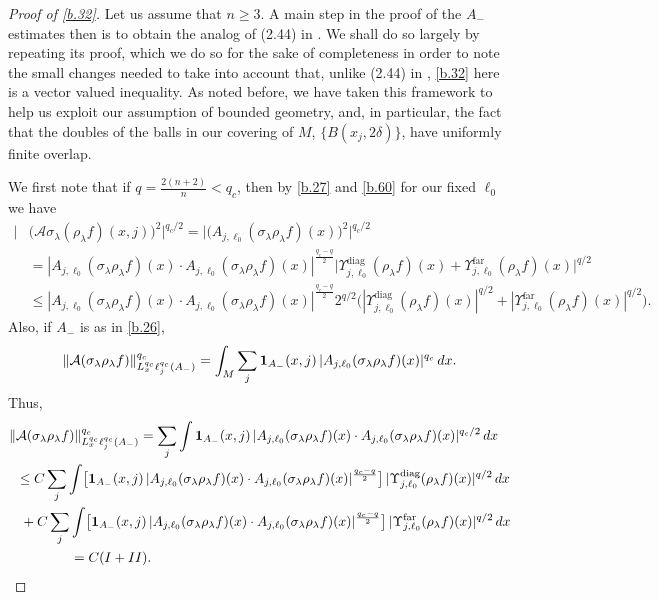 \documentclass[10pt]{amsart}
\newcommand{\la}{\lambda}
\newcommand{\1}{{\bf 1}}
\newcommand{\A}{{\mathcal A}}
\newcommand{\diag}{\Upsilon^{\text{diag}}}
\newcommand{\far}{\Upsilon^{\text{far}}}
\begin{document}
\begin{proof}[Proof of \eqref{b.32}]
Let us assume that $n\ge3$.  A main step in the proof of the $A_-$ estimates then is to obtain the analog of (2.44) in \cite{HSp}.
We shall do so largely by repeating its proof, which we do so for the sake of completeness in order to note the small changes needed
to take into account that, unlike (2.44) in \cite{HSp}, \eqref{b.32} here is a vector valued inequality.  As noted before, we have taken
this framework to help us exploit our assumption of bounded geometry, and,  in particular, the fact that the doubles of the balls 
in our covering of $M$, $\{B(x_j,2\delta)\}$,
have uniformly finite overlap.


We first note that if $q=\tfrac{2(n+2)}n<q_c$, then by \eqref{b.27} and  \eqref{b.60} for our fixed $\ell_0$ we have
\begin{align*}
\bigl|&\bigl(\A\sigma_\la (\rho_\la f)(x,j)\bigr)^2\bigr|^{q_c/2}=\bigl|\bigl(A_{j,\ell_0}(\sigma_\la\rho_\la f)(x) \bigr)^2\bigr|^{q_c/2}
\\
&=|A_{j,\ell_0}(\sigma_\la \rho_\la f)(x) \cdot A_{j,\ell_0}(\sigma_\la \rho_\la f)(x)|^{\frac{q_c-q}2}
\bigl| \diag_{j,\ell_0}(\rho_\la f)(x) +\far_{j,\ell_0}(\rho_\la f)(x)\bigr|^{q/2}
\\
&\le |A_{j,\ell_0}(\sigma_\la \rho_\la f)(x) \cdot A_{j,\ell_0}(\sigma_\la \rho_\la f)(x)|^{\frac{q_c-q}2}
 2^{q/2}  \bigl( 
|\diag_{j,\ell_0}(\rho_\la f)(x)|^{q/2}
+|\far_{j,\ell_0}(\rho_\la f)(x)|^{q/2} \bigr).
\end{align*}
Also, if $A_-$ is as in \eqref{b.26},
$$\| \A(\sigma_\la \rho_\la f)\|^{q_c}_{L^{q_c}_x \ell_j^{q_c}(A_-)}
=\int_M \sum_j \1_{A_-}(x,j) \, |A_{j,\ell_0}(\sigma_\la \rho_\la f)(x)|^{q_c} \, dx.
$$
Thus,
\begin{align*}
\| &\A(\sigma_\la \rho_\la f)\|^{q_c}_{L^{q_c}_x \ell_j^{q_c}(A_-)}
=\sum_j \int \1_{A_-}(x,j) \, |A_{j,\ell_0}(\sigma_\la \rho_\la f)(x)
\cdot
A_{j,\ell_0}(\sigma_\la \rho_\la f)(x)
|^{q_c/2} \, dx
\\
&\le C \sum_j \int 
\bigl[ \1_{A_-}(x,j) \, |A_{j,\ell_0}(\sigma_\la \rho_\la f)(x) \cdot A_{j,\ell_0}(\sigma_\la \rho_\la f)(x)|^{\frac{q_c-q}2}
\bigr] \, |\diag_{j,\ell_0}(\rho_\la f)(x)|^{q/2} \, dx
\\
&\, \, +C\sum_j  \int 
\bigl[ \1_{A_-}(x,j) \, |A_{j,\ell_0}(\sigma_\la \rho_\la f)(x) \cdot A_{j,\ell_0}(\sigma_\la \rho_\la f)(x)|^{\frac{q_c-q}2}
\bigr] \, |\far_{j,\ell_0}(\rho_\la f)(x)|^{q/2} \, dx
\\
&\qquad \qquad =C(I+II).
\end{align*}



\end{proof}
\end{document}
